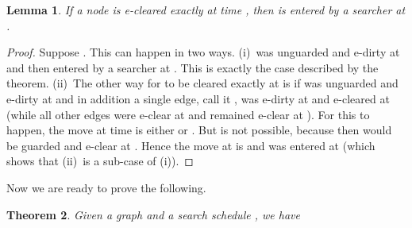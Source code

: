 \documentclass[11pt]{article}\usepackage{amsmath}
\newtheorem{theorem}{Theorem}[section]
\newtheorem{lemma}[theorem]{Lemma}
{\theoremstyle{definition}
\newtheorem{notation}[theorem]{Notation}
}
\begin{document}
\begin{lemma}
\label{prp0302}If a node  is e-cleared exactly at time , then  is
entered by a searcher at .
\end{lemma}

\begin{proof}
Suppose  . This can happen in two ways. (i)\  was unguarded and e-dirty at 
and then entered by a searcher at . This is exactly the case described by
the theorem. (ii)\ The other way for  to be cleared exactly at  is if
 was unguarded and e-dirty at  and in addition a single edge, call it
, was e-dirty at  and e-cleared at  (while all other edges
 were e-clear at  and remained e-clear at ). For this to happen,
the move at time  is either  or .
But  is not possible, because then  would be guarded
and e-clear at . Hence the move at  is  and 
was entered at  (which shows that (ii)\ is a sub-case of (i)).
\end{proof}

Now we are ready to prove the following.

\begin{theorem}
\label{prp0303}Given a graph  and a search schedule ,
we have


\end{theorem}
\end{document}
